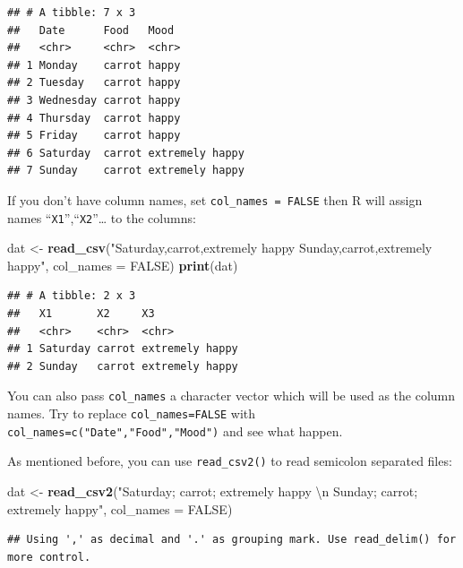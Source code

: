 \documentclass[12pt,]{krantz}
\makeatletter
\newenvironment{Shaded}{\begin{snugshade}}{\end{snugshade}}
\newcommand{\CharTok}[1]{\textcolor[rgb]{0.5,0.5,0.5}{#1}}
\newcommand{\DataTypeTok}[1]{\textcolor[rgb]{0.27,0.27,0.27}{#1}}
\newcommand{\KeywordTok}[1]{\textcolor[rgb]{0.27,0.27,0.27}{\textbf{#1}}}
\newcommand{\NormalTok}[1]{#1}
\newcommand{\OtherTok}[1]{\textcolor[rgb]{0.37,0.37,0.37}{#1}}
\newcommand{\StringTok}[1]{\textcolor[rgb]{0.5,0.5,0.5}{#1}}
\newenvironment{kframe}{%
\medskip{}
\setlength{\fboxsep}{.8em}
 \def\at@end@of@kframe{}%
 \ifinner\ifhmode%
  \def\at@end@of@kframe{\end{minipage}}%
  \begin{minipage}{\columnwidth}%
 \fi\fi%
 \def\FrameCommand##1{\hskip\@totalleftmargin \hskip-\fboxsep
 \colorbox{shadecolor}{##1}\hskip-\fboxsep
     \hskip-\linewidth \hskip-\@totalleftmargin \hskip\columnwidth}%
 \MakeFramed {\advance\hsize-\width
   \@totalleftmargin\z@ \linewidth\hsize
   \@setminipage}}%
 {\par\unskip\endMakeFramed%
 \at@end@of@kframe}
\renewenvironment{Shaded}{\begin{kframe}}{\end{kframe}}
\makeatother
\begin{document}
\begin{verbatim}
## # A tibble: 7 x 3
##   Date      Food   Mood           
##   <chr>     <chr>  <chr>          
## 1 Monday    carrot happy          
## 2 Tuesday   carrot happy          
## 3 Wednesday carrot happy          
## 4 Thursday  carrot happy          
## 5 Friday    carrot happy          
## 6 Saturday  carrot extremely happy
## 7 Sunday    carrot extremely happy
\end{verbatim}

If you don't have column names, set \texttt{col\_names\ =\ FALSE} then R will assign names ``\texttt{X1}'',``\texttt{X2}''\ldots{} to the columns:

\begin{Shaded}
\begin{Highlighting}[]
\NormalTok{dat <-}\StringTok{ }\KeywordTok{read_csv}\NormalTok{(}\StringTok{"Saturday,carrot,extremely happy}
\StringTok{          Sunday,carrot,extremely happy"}\NormalTok{, }\DataTypeTok{col_names =} \OtherTok{FALSE}\NormalTok{)}
\KeywordTok{print}\NormalTok{(dat)}
\end{Highlighting}
\end{Shaded}

\begin{verbatim}
## # A tibble: 2 x 3
##   X1       X2     X3             
##   <chr>    <chr>  <chr>          
## 1 Saturday carrot extremely happy
## 2 Sunday   carrot extremely happy
\end{verbatim}

You can also pass \texttt{col\_names} a character vector which will be used as the column names. Try to replace \texttt{col\_names=FALSE} with \texttt{col\_names=c("Date","Food","Mood")} and see what happen.

As mentioned before, you can use \texttt{read\_csv2()} to read semicolon separated files:

\begin{Shaded}
\begin{Highlighting}[]
\NormalTok{dat <-}\StringTok{ }\KeywordTok{read_csv2}\NormalTok{(}\StringTok{"Saturday; carrot; extremely happy }\CharTok{\textbackslash{}n}\StringTok{ Sunday; carrot; extremely happy"}\NormalTok{, }\DataTypeTok{col_names =} \OtherTok{FALSE}\NormalTok{)}
\end{Highlighting}
\end{Shaded}

\begin{verbatim}
## Using ',' as decimal and '.' as grouping mark. Use read_delim() for more control.
\end{verbatim}
\end{document}
